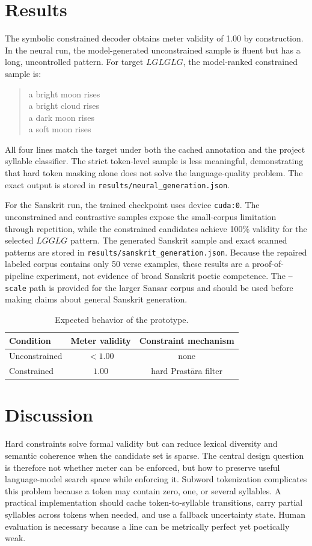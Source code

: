 \documentclass[conference]{IEEEtran}
\begin{document}
\section{Results}
The symbolic constrained decoder obtains meter validity of 1.00 by construction. In the neural run, the model-generated unconstrained sample is fluent but has a long, uncontrolled pattern. For target $LGLGLG$, the model-ranked constrained sample is:
\begin{quote}
a bright moon rises\\
a bright cloud rises\\
a dark moon rises\\
a soft moon rises
\end{quote}
All four lines match the target under both the cached annotation and the project syllable classifier. The strict token-level sample is less meaningful, demonstrating that hard token masking alone does not solve the language-quality problem. The exact output is stored in \texttt{results/neural\_generation.json}.

For the Sanskrit run, the trained checkpoint uses device \texttt{cuda:0}. The unconstrained and contrastive samples expose the small-corpus limitation through repetition, while the constrained candidates achieve 100\% validity for the selected $LGGLG$ pattern. The generated Sanskrit sample and exact scanned patterns are stored in \texttt{results/sanskrit\_generation.json}. Because the repaired labeled corpus contains only 50 verse examples, these results are a proof-of-pipeline experiment, not evidence of broad Sanskrit poetic competence. The \texttt{--scale} path is provided for the larger Sansar corpus and should be used before making claims about general Sanskrit generation.

\begin{table}[t]
\centering
\caption{Expected behavior of the prototype.}
\begin{tabular}{lcc}
\toprule
Condition & Meter validity & Constraint mechanism\\
\midrule
Unconstrained & $<1.00$ & none\\
Constrained & $1.00$ & hard Prastāra filter\\
\bottomrule
\end{tabular}
\end{table}

\section{Discussion}
Hard constraints solve formal validity but can reduce lexical diversity and semantic coherence when the candidate set is sparse. The central design question is therefore not whether meter can be enforced, but how to preserve useful language-model search space while enforcing it. Subword tokenization complicates this problem because a token may contain zero, one, or several syllables. A practical implementation should cache token-to-syllable transitions, carry partial syllables across tokens when needed, and use a fallback uncertainty state. Human evaluation is necessary because a line can be metrically perfect yet poetically weak.
\end{document}
